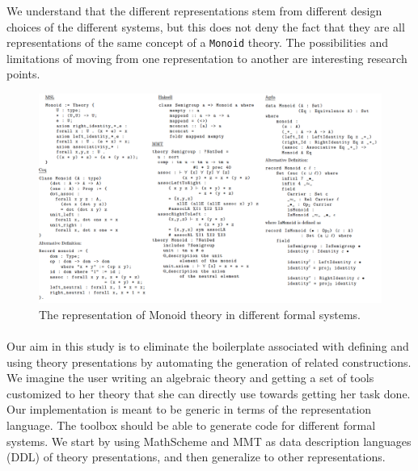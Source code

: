 We understand that the different representations stem from different design choices of the 
different systems, but this does not deny the fact that they are all representations of the same 
concept of a \verb|Monoid| theory. The possibilities and limitations of moving from one 
representation to another are interesting research points. 
\begin{figure}
\includegraphics[scale=0.4]{figures/monoid.png}
\caption{The representation of Monoid theory in different formal systems.}
\label{ex:monoid}
\end{figure}

\paragraph{}Our aim in this study is to eliminate the boilerplate associated with defining and using 
theory presentations by automating the generation of related constructions. We imagine the user 
writing an algebraic theory and getting a set of tools customized to her theory that she can directly 
use towards getting her task done. 
Our implementation is meant to be generic in terms of the representation language. The toolbox should be able to generate code for different formal systems.
We start by using MathScheme and MMT as data description languages (DDL) of theory presentations, and then generalize to other representations. 

